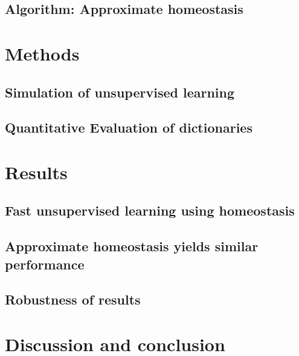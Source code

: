\documentclass[a4paper, 11pt]{article} %
\begin{document}
\subsection{Algorithm: Approximate homeostasis}\label{HAP}


\section{Methods}\label{methods}
\subsection{Simulation of unsupervised learning}



\subsection{Quantitative Evaluation of dictionaries}




\section{Results}\label{results}

\subsection{Fast unsupervised learning using homeostasis}


\subsection{Approximate homeostasis yields similar performance}


\subsection{Robustness of results}




\section{Discussion and conclusion}\label{discussion-et-conclusion}
\end{document}
